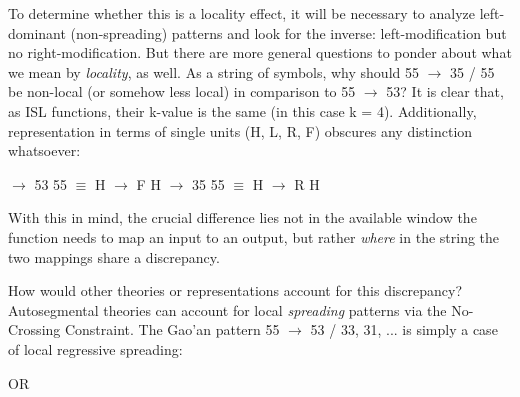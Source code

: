 \documentclass{article}
\begin{document}
To determine whether this is a locality effect, it will be necessary to analyze left-dominant (non-spreading) patterns and look for the inverse: left-modification but no right-modification. But there are more general questions to ponder about what we mean by \emph{locality}, as well. As a string of symbols, why should 55 $\rightarrow$ 35 / \underline{\hspace{1em}} 55 be non-local (or somehow less local) in comparison to 55 $\rightarrow$ 53? It is clear that, as ISL functions, their k-value is the same (in this case k = 4). Additionally, representation in terms of single units (H, L, R, F) obscures any distinction whatsoever:
\begin{exe}
\ex \label{patternX}
\begin{xlist}
	 $\rightarrow$ 53 \underline{\hspace{1em}} 55 $\equiv$ H $\rightarrow$ F \underline{\hspace{1em}} H
	 $\rightarrow$ 35 \underline{\hspace{1em}} 55 $\equiv$ H $\rightarrow$ R \underline{\hspace{1em}} H
\end{xlist}
\end{exe}
With this in mind, the crucial difference lies not in the available window the function needs to map an input to an output, but rather \emph{where} in the string the two mappings share a discrepancy.  \par
How would other theories or representations account for this discrepancy? Autosegmental theories can account for local \emph{spreading} patterns via the No-Crossing Constraint. The Gao'an pattern 55 $\rightarrow$ 53 / \underline{\hspace{1em}} 33, 31, ... is simply a case of local regressive spreading:
\begin{exe}
\ex
{}
\hspace{.75cm} OR \hspace{.75cm}
\end{exe}
\end{document}
